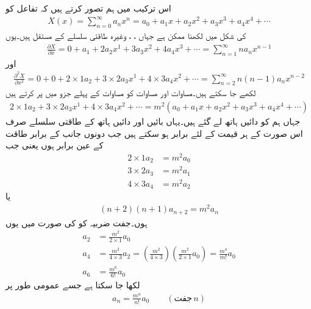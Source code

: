 اس ترکیب میں ہم تصور کرتے ہیں کہ  تفاعل کو 
\begin{align}\label{مساوات_لاپلاس_طاقتی_سلسلہ_الف}
X(x)=\sum_{n=0}^{\infty} a_n x^n=a_0 +a_1x+a_2 x^2+a_3 x^3+a_4 x^4+\cdots
\end{align}
کی شکل میں لکھنا ممکن ہے جہاں ، ،  وغیرہ طاقتی سلسلے کے مستقل ہیں۔یوں 
\begin{align*}
\frac{\partial X}{\partial x}=0 +a_1+2 a_2 x^1+3a_3 x^2+4a_4 x^3+\cdots=\sum_{n=1}^{\infty} n a_n x^{n-1}
\end{align*}
اور
\begin{align}\label{مساوات_لاپلاس_طاقتی_سلسلہ_ب}
\frac{\partial^2 X}{\partial x^2}=0 +0+2 \times 1  a_2+3 \times 2 a_3 x^1+4 \times 3 a_4 x^2+\cdots=\sum_{n=2}^{\infty} n(n-1) a_n x^{n-2}
\end{align}
لکھے جا سکتے ہیں۔مساوات  اور مساوات  کو مساوات  کے پہلے جزو میں پر کرتے ہیں
\begin{align*}
 2 \times 1  a_2+3 \times 2 a_3 x^1+4 \times 3 a_4 x^2+\cdots =m^2 \left(a_0 +a_1x+a_2 x^2+a_3 x^3+a_4 x^4+\cdots \right)
\end{align*}  
جہاں ہم  کو دائیں ہاتھ لے گئے ہیں۔یہاں بائیں اور دائیں ہاتھ کے طاقتی سلسلے صرف اس صورت  کے ہر قیمت کے لئے برابر ہو سکتے ہیں جب دونوں جانب   کے برابر طاقت کے  عین برابر ہوں یعنی جب
\begin{align*}
2 \times 1  a_2&=m^2 a_0\\
3 \times 2 a_3&=m^2 a_1\\
4 \times 3 a_4&=m^2 a_2
\end{align*}
یا
\begin{align*}
(n+2)(n+1)a_{n+2}=m^2 a_n
\end{align*}
ہوں۔جفت ضربیہ کو  کی صورت میں یوں
\begin{align*}
a_2&=\frac{m^2 }{2 \times 1} a_0\\
a_4&=\frac{m^2 }{4 \times 3} a_2=\left(\frac{m^2 }{4 \times 3}\right)\left(\frac{m^2 }{2 \times 1} a_0\right)=\frac{m^4}{m!}a_0\\
a_6&=\frac{m^6}{6!}a_0
\end{align*}
 لکھا جا سکتا ہے جسے عمومی طور پر
\begin{align*}
a_n=\frac{m^{n}}{n!}a_0 \quad \quad (\textrm{جفت}\, n)
\end{align*}
